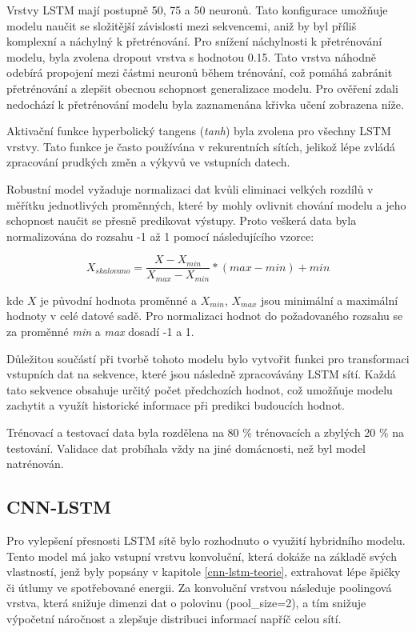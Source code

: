 \documentclass[FM,BP,fonts]{tulthesis}
\begin{document}
Vrstvy LSTM mají postupně 50, 75 a 50 neuronů. Tato konfigurace umožňuje modelu naučit se složitější závislosti mezi sekvencemi, aniž by byl příliš komplexní a náchylný k přetrénování. Pro snížení náchylnosti k přetrénování modelu, byla zvolena dropout vrstva s hodnotou 0.15. Tato vrstva náhodně odebírá propojení mezi částmi neuronů během trénování, což pomáhá zabránit přetrénování a zlepšit obecnou schopnost generalizace modelu. Pro ověření zdali nedochází k přetrénování modelu byla zaznamenána křivka učení zobrazena níže.

Aktivační funkce hyperbolický tangens (\textit{tanh}) byla zvolena pro všechny LSTM vrstvy. Tato funkce je často používána v rekurentních sítích, jelikož lépe zvládá zpracování prudkých změn a výkyvů ve vstupních datech. \cite{SHEN2022117181}

Robustní model vyžaduje normalizaci dat kvůli eliminaci velkých rozdílů v měřítku jednotlivých proměnných, které by mohly ovlivnit chování modelu a jeho schopnost naučit se přesně predikovat výstupy. Proto veškerá data byla normalizována do rozsahu -1 až 1 pomocí následujícího vzorce: 

\begin{equation}	
	X_{skalovano} = \frac{X - X_{min}}{X_{max} - X_{min}} * (max - min) + min
\end{equation}

kde $X$ je původní hodnota proměnné a $X_{min}$, $X_{max}$ jsou minimální a maximální hodnoty v celé datové sadě. Pro normalizaci hodnot do požadovaného rozsahu se za proměnné \textit{min} a \textit{max} dosadí -1 a 1.

Důležitou součástí při tvorbě tohoto modelu bylo vytvořit funkci pro transformaci vstupních dat na sekvence, které jsou následně zpracovávány LSTM sítí. Každá tato sekvence obsahuje určitý počet předchozích hodnot, což umožňuje modelu zachytit a využít historické informace při predikci budoucích hodnot.

Trénovací a testovací data byla rozdělena na 80 \% trénovacích a zbylých 20 \% na testování. Validace dat probíhala vždy na jiné domácnosti, než byl model natrénován. 
 
\subsection{CNN-LSTM}

Pro vylepšení přesnosti LSTM sítě bylo rozhodnuto o využití hybridního modelu. Tento model má jako vstupní vrstvu konvoluční, která dokáže na základě svých vlastností, jenž byly popsány v kapitole \ref{cnn-lstm-teorie}, extrahovat lépe špičky či útlumy ve spotřebované energii. Za konvoluční vrstvou následuje poolingová vrstva, která snižuje dimenzi dat o polovinu (pool\_size=2), a tím snižuje výpočetní náročnost a zlepšuje distribuci informací napříč celou sítí.
\end{document}
